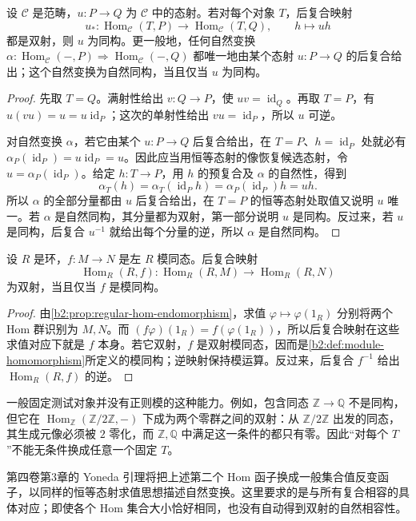 \begin{proposition}[由映射检测同构]\label{b2:prop:hom-detects-isomorphism}
	设 \(\mathcal C\) 是范畴，\(u:P\rightarrow Q\) 为 \(\mathcal C\) 中的态射。若对每个对象 \(T\)，后复合映射
	\[
		u_*:\operatorname{Hom}_{\mathcal C}(T,P)\longrightarrow \operatorname{Hom}_{\mathcal C}(T,Q),\qquad h\longmapsto uh
	\]
	都是双射，则 \(u\) 为同构。更一般地，任何自然变换 \(\alpha:\operatorname{Hom}_{\mathcal C}(-,P)\Rightarrow \operatorname{Hom}_{\mathcal C}(-,Q)\) 都唯一地由某个态射 \(u:P\rightarrow Q\) 的后复合给出；这个自然变换为自然同构，当且仅当 \(u\) 为同构。
\end{proposition}
\begin{proof}
	先取 \(T=Q\)。满射性给出 \(v:Q\rightarrow P\)，使 \(uv=\operatorname{id}_Q\)。再取 \(T=P\)，有 \(u(vu)=u=u\operatorname{id}_P\)；这次的单射性给出 \(vu=\operatorname{id}_P\)，所以 \(u\) 可逆。

	对自然变换 \(\alpha\)，若它由某个 \(u:P\to Q\) 后复合给出，在 \(T=P\)、\(h=\operatorname{id}_P\) 处就必有 \(\alpha_P(\operatorname{id}_P)=u\operatorname{id}_P=u\)。因此应当用恒等态射的像恢复候选态射，令 \(u=\alpha_P(\operatorname{id}_P)\)。给定 \(h:T\rightarrow P\)，用 \(h\) 的预复合及 \(\alpha\) 的自然性，得到
	\[
		\alpha_T(h)=\alpha_T(\operatorname{id}_P h) =\alpha_P(\operatorname{id}_P)h=uh.
	\]
	所以 \(\alpha\) 的全部分量都由 \(u\) 后复合给出，在 \(T=P\) 的恒等态射处取值又说明 \(u\) 唯一。若 \(\alpha\) 是自然同构，其分量都为双射，第一部分说明 \(u\) 是同构。反过来，若 \(u\) 是同构，后复合 \(u^{-1}\) 就给出每个分量的逆，所以 \(\alpha\) 是自然同构。
\end{proof}

\begin{corollary}[正则模检测同构]\label{b2:cor:regular-module-detects}
	设 \(R\) 是环，\(f:M\to N\) 是左 \(R\) 模同态。后复合映射
	\[
		\operatorname{Hom}_R(R,f):\operatorname{Hom}_R(R,M) \longrightarrow\operatorname{Hom}_R(R,N)
	\]
	为双射，当且仅当 \(f\) 是模同构。
\end{corollary}
\begin{proof}
	由\cref{b2:prop:regular-hom-endomorphism}，求值 \(\varphi\mapsto\varphi(1_R)\) 分别将两个 Hom 群识别为 \(M,N\)。而 \((f\varphi)(1_R)=f(\varphi(1_R))\)，所以后复合映射在这些求值对应下就是 \(f\) 本身。若它双射，\(f\) 是双射模同态，因而是\cref{b2:def:module-homomorphism}所定义的模同构；逆映射保持模运算。反过来，后复合 \(f^{-1}\) 给出 \(\operatorname{Hom}_R(R,f)\) 的逆。
\end{proof}

一般固定测试对象并没有正则模的这种能力。例如，包含同态 \(\mathbb Z\to\mathbb Q\) 不是同构，但它在 \(\operatorname{Hom}_{\mathbb Z}(\mathbb Z/2\mathbb Z,-)\) 下成为两个零群之间的双射：从 \(\mathbb Z/2\mathbb Z\) 出发的同态，其生成元像必须被 \(2\) 零化，而 \(\mathbb Z,\mathbb Q\) 中满足这一条件的都只有零。因此“对每个 \(T\)”不能无条件换成任意一个固定 \(T\)。

\ProseParagraphBreak
第四卷第3章的 Yoneda 引理将把上述第二个 Hom 函子换成一般集合值反变函子，以同样的恒等态射求值思想描述自然变换。这里要求的是与所有复合相容的具体对应；即使各个 Hom 集合大小恰好相同，也没有自动得到双射的自然相容性。
